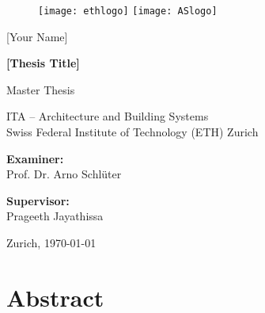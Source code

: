 
\frontmatter
\hypersetup{pageanchor=false}
\begin{titlepage}

\begin{center}

\begin{figure}[!ht]
\texttt{[image: ethlogo]}
\hfill
\texttt{[image: ASlogo]}
\end{figure}

\vspace{30mm} 

[Your Name] \\

\vspace{10mm} 
\begin{doublespace}
\textbf{\LARGE [Thesis Title]} \\
\end{doublespace}

\vspace{10mm} 

Master Thesis \\ 


\vfill

ITA -- Architecture and Building Systems\\ 
Swiss Federal Institute of Technology (ETH) Zurich \\

\vspace{5mm}

\textbf{Examiner:}\\ 
Prof. Dr. Arno Schl\"uter\\

\vspace{5mm} 

\textbf{Supervisor:} \\
Prageeth Jayathissa

\vspace{5mm} Zurich, \today

\end{center}
\end{titlepage}
\hypersetup{pageanchor=true}


\chapter*{Abstract}





